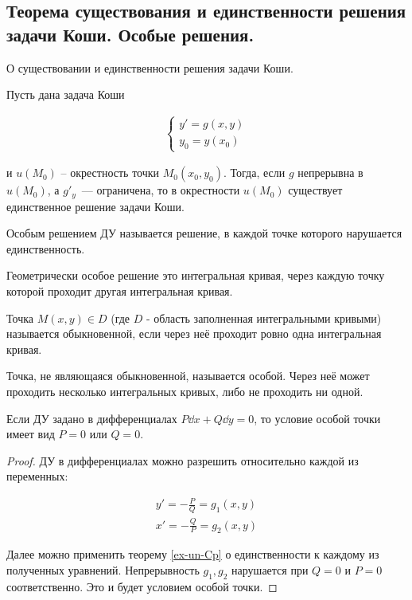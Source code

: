 \subsection{%
  Теорема существования и единственности решения задачи Коши. Особые решения.%
}

\begin{theorem}\label{ex-un-Cp}
  О существовании и единственности решения задачи Коши.

  Пусть дана задача Коши

  \begin{align*}
    \begin{cases}
      y' = g(x, y) \\
      y_{0} = y(x_{0})
    \end{cases}
  \end{align*}

  и \(u(M_{0})\) -- окрестность точки \(M_{0}(x_{0}, y_{0})\). Тогда, если
  \(g\) непрерывна в \(u(M_{0})\), а \(g'_{y}\)~--- ограничена, то в окрестности
  \(u(M_{0})\) существует единственное решение задачи Коши.
\end{theorem}

\begin{definition}
  Особым решением ДУ называется решение, в каждой точке которого нарушается
  единственность.
\end{definition}

\begin{remark}
  Геометрически особое решение это интегральная кривая, через каждую точку
  которой проходит другая интегральная кривая.
\end{remark}

\begin{definition}
  Точка \(M(x, y) \in D\) (где \(D\) - область заполненная интегральными
  кривыми) называется обыкновенной, если через неё проходит ровно одна
  интегральная кривая.
\end{definition}

\begin{definition}
  Точка, не являющаяся обыкновенной, называется особой. Через неё может
  проходить несколько интегральных кривых, либо не проходить ни одной.
\end{definition}

\begin{lemma}
  Если ДУ задано в дифференциалах \(P \dd x + Q \dd y = 0\), то условие особой
  точки имеет вид \(P = 0\) или \(Q = 0\).
\end{lemma}
\begin{proof}
  ДУ в дифференциалах можно разрешить относительно каждой из переменных:

  \begin{align*}
    y' = - \frac{P}{Q} = g_{1}(x, y) \\
    x' = - \frac{Q}{P} = g_{2}(x, y)
  \end{align*}

  Далее можно применить теорему \ref{ex-un-Cp} о единственности к каждому
  из полученных уравнений. Непрерывность \(g_{1}, g_{2}\) нарушается при
  \(Q = 0\) и \(P = 0\) соответственно. Это и будет условием особой точки.
\end{proof}
